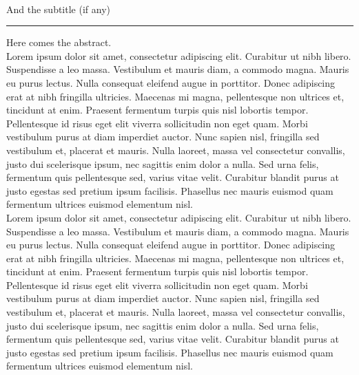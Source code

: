 

\newpage
\thispagestyle{empty}

\renewcommand{\arraystretch}{1.8}

\\{\large And the subtitle (if any)}

\noindent \rule{\linewidth}{0.5pt}
\vspace{0.1cm}


\noindent Here comes the abstract. \\

Lorem ipsum dolor sit amet, consectetur adipiscing elit. Curabitur ut nibh libero. Suspendisse a leo massa. Vestibulum et mauris diam, a commodo magna. Mauris eu purus lectus. Nulla consequat eleifend augue in porttitor. Donec adipiscing erat at nibh fringilla ultricies. Maecenas mi magna, pellentesque non ultrices et, tincidunt at enim. Praesent fermentum turpis quis nisl lobortis tempor. Pellentesque id risus eget elit viverra sollicitudin non eget quam. Morbi vestibulum purus at diam imperdiet auctor. Nunc sapien nisl, fringilla sed vestibulum et, placerat et mauris. Nulla laoreet, massa vel consectetur convallis, justo dui scelerisque ipsum, nec sagittis enim dolor a nulla. Sed urna felis, fermentum quis pellentesque sed, varius vitae velit. Curabitur blandit purus at justo egestas sed pretium ipsum facilisis. Phasellus nec mauris euismod quam fermentum ultrices euismod elementum nisl.\\

Lorem ipsum dolor sit amet, consectetur adipiscing elit. Curabitur ut nibh libero. Suspendisse a leo massa. Vestibulum et mauris diam, a commodo magna. Mauris eu purus lectus. Nulla consequat eleifend augue in porttitor. Donec adipiscing erat at nibh fringilla ultricies. Maecenas mi magna, pellentesque non ultrices et, tincidunt at enim. Praesent fermentum turpis quis nisl lobortis tempor. Pellentesque id risus eget elit viverra sollicitudin non eget quam. Morbi vestibulum purus at diam imperdiet auctor. Nunc sapien nisl, fringilla sed vestibulum et, placerat et mauris. Nulla laoreet, massa vel consectetur convallis, justo dui scelerisque ipsum, nec sagittis enim dolor a nulla. Sed urna felis, fermentum quis pellentesque sed, varius vitae velit. Curabitur blandit purus at justo egestas sed pretium ipsum facilisis. Phasellus nec mauris euismod quam fermentum ultrices euismod elementum nisl.